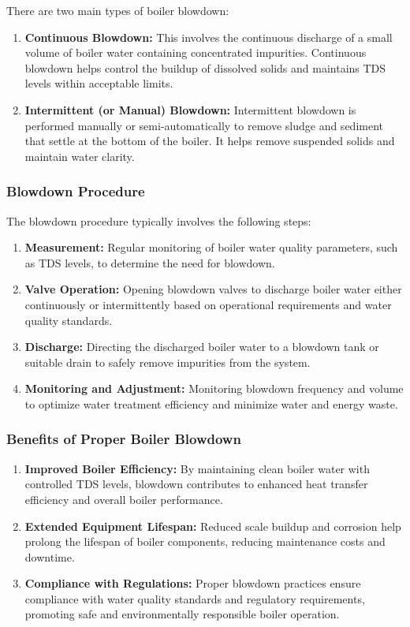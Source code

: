 There are two main types of boiler blowdown:
\begin{enumerate}
    \item \textbf{Continuous Blowdown:} This involves the continuous discharge of a small volume of boiler water containing concentrated impurities. Continuous blowdown helps control the buildup of dissolved solids and maintains TDS levels within acceptable limits.
    \item \textbf{Intermittent (or Manual) Blowdown:} Intermittent blowdown is performed manually or semi-automatically to remove sludge and sediment that settle at the bottom of the boiler. It helps remove suspended solids and maintain water clarity.
\end{enumerate}

\subsubsection{Blowdown Procedure}

The blowdown procedure typically involves the following steps:
\begin{enumerate}
    \item \textbf{Measurement:} Regular monitoring of boiler water quality parameters, such as TDS levels, to determine the need for blowdown.
    \item \textbf{Valve Operation:} Opening blowdown valves to discharge boiler water either continuously or intermittently based on operational requirements and water quality standards.
    \item \textbf{Discharge:} Directing the discharged boiler water to a blowdown tank or suitable drain to safely remove impurities from the system.
    \item \textbf{Monitoring and Adjustment:} Monitoring blowdown frequency and volume to optimize water treatment efficiency and minimize water and energy waste.
\end{enumerate}

\subsubsection{Benefits of Proper Boiler Blowdown}

\begin{enumerate}
    \item \textbf{Improved Boiler Efficiency:} By maintaining clean boiler water with controlled TDS levels, blowdown contributes to enhanced heat transfer efficiency and overall boiler performance.
    \item \textbf{Extended Equipment Lifespan:} Reduced scale buildup and corrosion help prolong the lifespan of boiler components, reducing maintenance costs and downtime.
    \item \textbf{Compliance with Regulations:} Proper blowdown practices ensure compliance with water quality standards and regulatory requirements, promoting safe and environmentally responsible boiler operation.
\end{enumerate}

